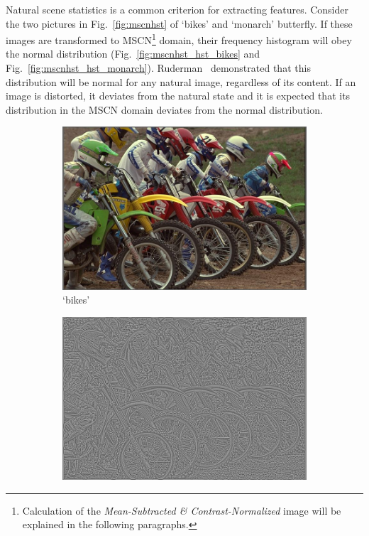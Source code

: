 Natural scene statistics is a common criterion for extracting features. Consider the two pictures in Fig.~\ref{fig:mscnhst} of `bikes' and `monarch' butterfly. If these images are transformed to MSCN\footnote{Calculation of the \emph{Mean-Subtracted \& Contrast-Normalized} image will be explained in the following paragraphs.} domain, their frequency histogram will obey the normal distribution (Fig.~\ref{fig:mscnhst_hst_bikes} and Fig.~\ref{fig:mscnhst_hst_monarch}). Ruderman~\cite{Ruderman1994} demonstrated that this distribution will be normal for any natural image, regardless of its content. If an image is distorted, it deviates from the natural state and it is expected that its distribution in the MSCN domain deviates from the normal distribution.
\begin{figure}
     \centering
     \begin{subfigure}[b]{0.3\textwidth}
         \centering
         \includegraphics[width=\textwidth]{./figs/reference}
         \caption{`bikes'}
         \label{fig:mscnhst_bikes}
     \end{subfigure}
     \hfill
     \begin{subfigure}[b]{0.3\textwidth}
         \centering
         \includegraphics[width=\textwidth]{./figs/mscn_reference}

\end{subfigure}
\end{figure}
